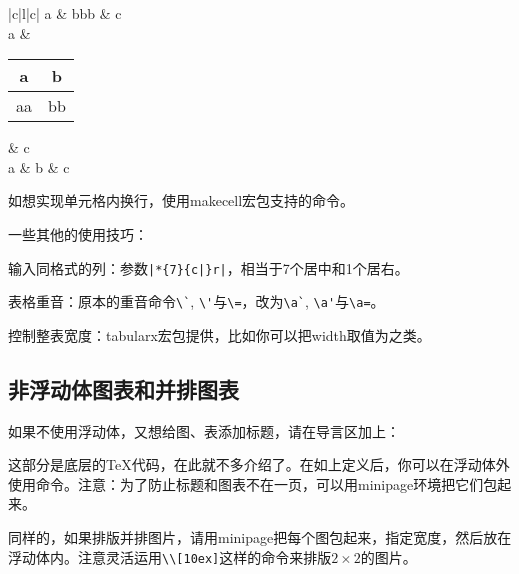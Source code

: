 {\begin{codeshow}
\begin{tabular}{|c|l|c|}
\hline
a & bbb & c \\ \hline
a & 
{\begin{tabular}{c|c}
a & b \\ \hline
aa & bb \\
\end{tabular}}
& c \\ \hline
a & b & c \\ \hline
\end{tabular}
\end{codeshow}

如想实现单元格内换行，使用makecell宏包支持的\latexline{\\makecell}命令。

一些其他的使用技巧：
\begin{feae}
\item 输入同格式的列：参数\verb+|*{7}{c|}r|+，相当于7个居中和1个居右。
\item 表格重音：原本的重音命令\verb|\`|, \verb|\'|与\verb|\=|，改为\verb|\a`|, \verb|\a'|与\verb|\a=|。
\item 控制整表宽度：tabularx宏包提供，比如你可以把width取值为之类。
\end{feae}

\subsection{非浮动体图表和并排图表}
如果不使用浮动体，又想给图、表添加标题，请在导言区加上：
\begin{latex}{}
\makeatletter
\newcommand\figcaption{\def\@captype{figure}\caption}
\newcommand\tabcaption{\def\@captype{table}\caption}
\makeatother
\end{latex}

这部分是底层的\TeX 代码，在此就不多介绍了。在如上定义后，你可以在浮动体外使用命令。注意：为了防止标题和图表不在一页，可以用minipage环境把它们包起来。

同样的，如果排版并排图片，请用minipage把每个图包起来，指定宽度，然后放在浮动体内。注意灵活运用\verb|\\[10ex]|这样的命令来排版$2\times 2$的图片。

}
